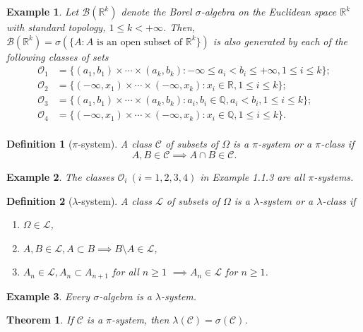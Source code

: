\documentclass{report}
\newtheorem{definition}{Definition}[section]
\newtheorem{example}{Example}[section]
\newtheorem{theorem}{Theorem}[section]
\theoremstyle{nonumberplain}
\begin{document}
\begin{example}
	Let $\mathcal{B}(\mathbb{R}^k)$ denote the Borel $\sigma$-algebra on the Euclidean space $\mathbb{R}^k$ with standard topology, $1\le k < +\infty$. Then, $\mathcal{B}(\mathbb{R}^k)=\sigma(\{A : A\text{ is an open subset of } \mathbb{R}^k\})$
	is also generated by each of the following classes of sets
	\begin{align*}
	\mathcal{O}_1&=\{(a_1, b_1)\times\cdots\times(a_k,b_k):-\infty\le a_i< b_i\le+\infty,1\le i\le k\};\\
	\mathcal{O}_2&=\{(-\infty, x_1)\times\cdots\times(-\infty,x_k):x_i\in\mathbb{R},1\le i\le k\};\\
	\mathcal{O}_3&=\{(a_1, b_1)\times\cdots\times(a_k,b_k):a_i, b_i\in\mathbb{Q},a_i<b_i,1\le i\le k\};\\
	\mathcal{O}_4&=\{(-\infty, x_1)\times\cdots\times(-\infty,x_k):x_i\in\mathbb{Q},1\le i\le k\}.\\
	\end{align*}
\end{example}

\begin{definition}[$\pi$-system]
	A class $\mathcal{C}$ of subsets of $\Omega$ is a $\pi$-system or a $\pi$-class if 
	\[
	A,B\in\mathcal{C} \implies A\cap B \in \mathcal{C}.
	\]
\end{definition}
\begin{example}
	The classes $\mathcal{O}_i\ (i=1,2,3,4)$ in Example 1.1.3 are all $\pi$-systems.
\end{example}
\begin{definition}[$\lambda$-system]
A class $\mathcal{L}$ of subsets of $\Omega$ is a $\lambda$-system or a $\lambda$-class if
\begin{enumerate}
	\item [(a)] $\Omega\in \mathcal{L}$,
	\item [(b)] $A,B\in\mathcal{L},A \subset B\implies B\setminus A\in\mathcal{L}$,
	\item [(c)] $A_n \in\mathcal{L},A_n\subset A_{n+1}$ for all $n\ge1$ $\implies A_n\in\mathcal{L}$ for $n\ge1$.
\end{enumerate}
\end{definition}

\begin{example}
	Every $\sigma$-algebra is a $\lambda$-system.
\end{example}

\begin{theorem}
	If $\mathcal{C}$ is a $\pi$-system, then $\lambda(\mathcal{C})=\sigma(\mathcal{C})$.
\end{theorem}
\end{document}

